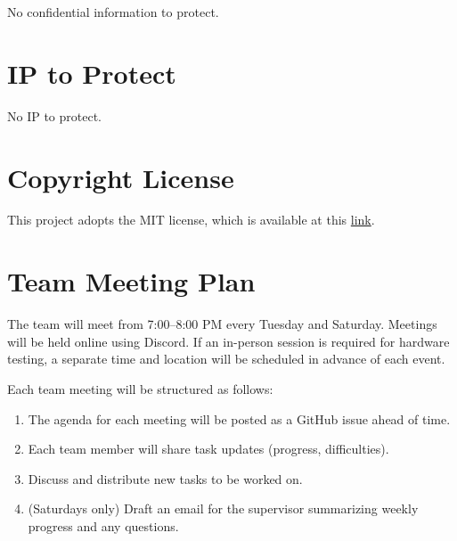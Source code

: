 \documentclass{article}
\begin{document}

No confidential information to protect.

\section{IP to Protect}


No IP to protect.

\section{Copyright License}


This project adopts the MIT license, which is available at this
\href{https://github.com/ZifanSi/vision-guided-tracker/blob/main/LICENSE}{link}.

\section{Team Meeting Plan}

The team will meet from 7:00–8:00 PM every Tuesday and Saturday. Meetings will
be held online using Discord. If an in-person session is required for hardware
testing, a separate time and location will be scheduled in advance of each
event.

Each team meeting will be structured as follows:

\begin{enumerate}
  \item The agenda for each meeting will be posted as a GitHub issue ahead of time.
  \item Each team member will share task updates (progress, difficulties).
  \item Discuss and distribute new tasks to be worked on.
  \item (Saturdays only) Draft an email for the supervisor summarizing weekly progress and any questions.
\end{enumerate}
\end{document}

